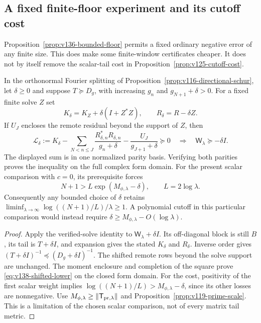 \subsection*{A fixed finite-floor experiment and its cutoff cost}

Proposition~\ref{prop:v136-bounded-floor} permits a fixed ordinary
negative error of any finite size. This does make some finite-window
certificates cheaper. It does not by itself remove the scalar-tail
cost in Proposition~\ref{prop:v125-cutoff-cost}.

\begin{proposition}
\label{prop:v138-shifted-floor}
In the orthonormal Fourier splitting of
Proposition~\ref{prop:v116-directional-schur}, let $\delta\ge0$ and
suppose $T\succeq D_g$, with increasing $g_n$ and
$g_{N+1}+\delta>0$. For a fixed finite solve $Z$ set
\[
 K_\delta=K_Z+\delta(I+Z^*Z),\qquad
 R_\delta=R-\delta Z.
\]
If $U_J$ encloses the remote residual beyond the support of $Z$, then
\begin{equation}\label{eq:v138-shifted-lower}
 \mathcal L_\delta:=K_\delta-
 \sum_{N<n\le J}\frac{R_{\delta,n}^*R_{\delta,n}}{g_n+\delta}
 -\frac{U_J}{g_{J+1}+\delta}\succeq0
 \quad\Longrightarrow\quad
 \mathsf W_\lambda\succeq-\delta I.
\end{equation}
The displayed sum is in one normalized parity basis. Verifying both
parities proves the inequality on the full complex form domain.
For the present scalar comparison with $c=0$, its prerequisite forces
\begin{equation}\label{eq:v138-shifted-cost}
 N+1>L\exp(M_{\phi,\lambda}-\delta),\qquad L=2\log\lambda.
\end{equation}
Consequently any bounded choice of $\delta$ retains
$\liminf_{\lambda\to\infty}\log((N+1)/L)/\lambda\ge1$.
A polynomial cutoff in this particular comparison would instead
require $\delta\ge M_{\phi,\lambda}-O(\log\lambda)$.
\end{proposition}
\begin{proof}
Apply the verified-solve identity to $\mathsf W_\lambda+\delta I$.
Its off-diagonal block is still $B$, its tail is $T+\delta I$, and
expansion gives the stated $K_\delta$ and $R_\delta$. Inverse order
gives $(T+\delta I)^{-1}\preceq(D_g+\delta I)^{-1}$.
The shifted remote rows beyond the solve support are unchanged.
The moment enclosure and completion of the square prove
\eqref{eq:v138-shifted-lower} on the closed form domain.
For the cost, positivity of the first scalar weight implies
$\log((N+1)/L)>M_{\phi,\lambda}-\delta$, since its other losses
are nonnegative. Use
$M_{\phi,\lambda}\ge\|\mathsf T_{{\rm pr},\lambda}\|$ and
Proposition~\ref{prop:v119-prime-scale}. This is a limitation of
the chosen scalar comparison, not of every matrix tail metric.
\end{proof}

